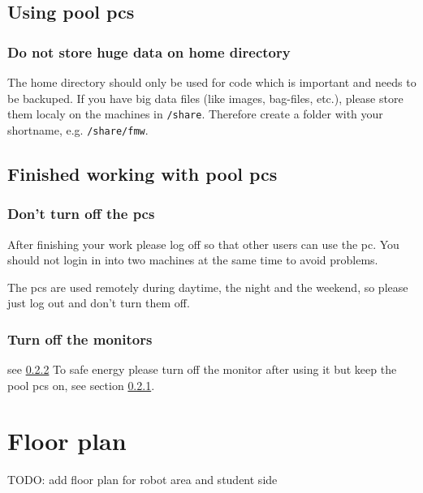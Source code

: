 \subsection{Using pool pcs}
\subsubsection{Do not store huge data on home directory}
The home directory should only be used for code which is important and needs to be backuped. If you have big data files (like images, bag-files, etc.), please store them localy on the machines in \texttt{/share}. Therefore create a folder with your shortname, e.g. \texttt{/share/fmw}.

\subsection{Finished working with pool pcs}
\subsubsection{Don't turn off the pcs}\label{sec:poolpcs}
After finishing your work please log off so that other users can use the pc. You should not login in into two machines at the same time to avoid problems. 

The pcs are used remotely during daytime, the night and the weekend, so please just log out and don't turn them off.

\subsubsection{Turn off the monitors}\label{sec:monitor}
see \ref{sec:monitor}
To safe energy please turn off the monitor after using it but keep the pool pcs on, see section \ref{sec:poolpcs}.




\section{Floor plan}\label{sec:floorplan}
TODO: add floor plan for robot area and student side